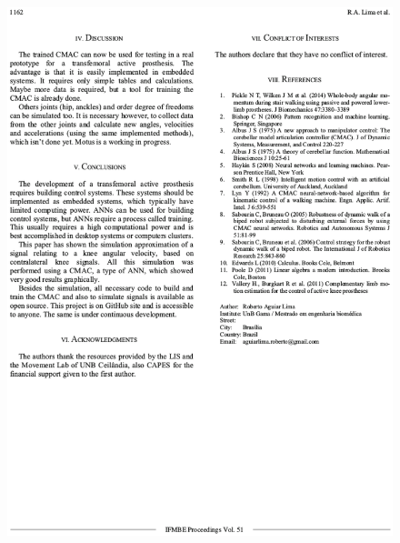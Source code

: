 \begin{apendicesenv}
\begin{figure}[ht]
		\includegraphics[width=17cm]{figuras/wc201504.eps}
	\label{wc201504}
	\end{figure}


\end{apendicesenv}
